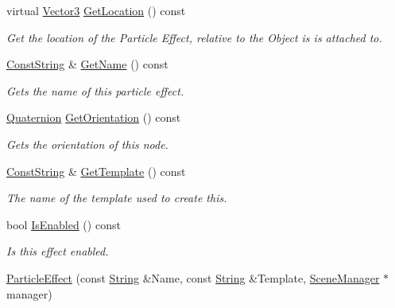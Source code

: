 \begin{DoxyCompactItemize}
virtual \hyperlink{classphys_1_1Vector3}{Vector3} \hyperlink{classphys_1_1ParticleEffect_a1776793641c2133def40b572883b4241}{GetLocation} () const 
\begin{DoxyCompactList}\small\item\em Get the location of the Particle Effect, relative to the Object is is attached to. \item\end{DoxyCompactList}\item 
\hyperlink{namespacephys_a5ce5049f8b4bf88d6413c47b504ebb31}{ConstString} \& \hyperlink{classphys_1_1ParticleEffect_a770309a3ec74b8bff6169ce5aecc64e7}{GetName} () const 
\begin{DoxyCompactList}\small\item\em Gets the name of this particle effect. \item\end{DoxyCompactList}\item 
\hyperlink{classphys_1_1Quaternion}{Quaternion} \hyperlink{classphys_1_1ParticleEffect_ac3f90a940601fbe0657f5d8eb51f0509}{GetOrientation} () const 
\begin{DoxyCompactList}\small\item\em Gets the orientation of this node. \item\end{DoxyCompactList}\item 
\hyperlink{namespacephys_a5ce5049f8b4bf88d6413c47b504ebb31}{ConstString} \& \hyperlink{classphys_1_1ParticleEffect_a7234a58e42de201111439b58433c2319}{GetTemplate} () const 
\begin{DoxyCompactList}\small\item\em The name of the template used to create this. \item\end{DoxyCompactList}\item 
bool \hyperlink{classphys_1_1ParticleEffect_aaa4f853811fe2f638d03f09143fd08ca}{IsEnabled} () const 
\begin{DoxyCompactList}\small\item\em Is this effect enabled. \item\end{DoxyCompactList}\item 
\hyperlink{classphys_1_1ParticleEffect_a42d17b7cd81968603c70920c30e6f812}{ParticleEffect} (const \hyperlink{namespacephys_aa03900411993de7fbfec4789bc1d392e}{String} \&Name, const \hyperlink{namespacephys_aa03900411993de7fbfec4789bc1d392e}{String} \&Template, \hyperlink{classphys_1_1SceneManager}{SceneManager} $\ast$manager)

\end{DoxyCompactItemize}
